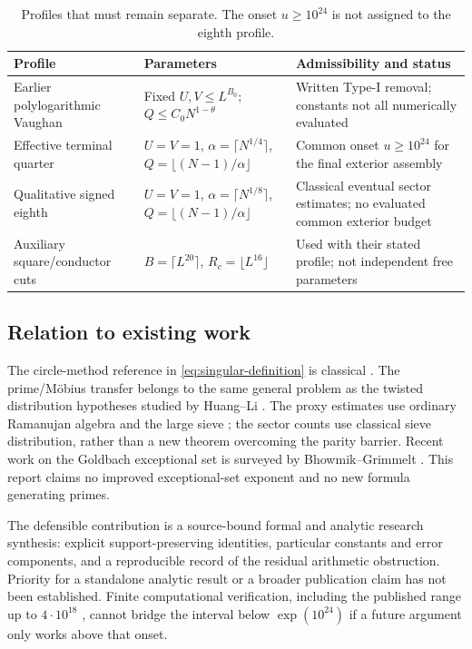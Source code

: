\documentclass[11pt,a4paper]{article}
\theoremstyle{definition}
\theoremstyle{remark}
\begin{document}
\begin{table}[htbp]\centering\small
\begin{tabularx}{\textwidth}{@{}P{.24\textwidth}XP{.24\textwidth}@{}}\toprule
Profile & Parameters & Admissibility and status\\\midrule
Earlier polylogarithmic Vaughan & Fixed $U,V\le L^{B_0}$; $Q\le C_0N^{1-\theta}$ & Written Type-I removal; constants not all numerically evaluated\\
Effective terminal quarter & $U=V=1$, $\alpha=\lceil N^{1/4}\rceil$, $Q=\lfloor(N-1)/\alpha\rfloor$ & Common onset $u\ge10^{24}$ for the final exterior assembly\\
Qualitative signed eighth & $U=V=1$, $\alpha=\lceil N^{1/8}\rceil$, $Q=\lfloor(N-1)/\alpha\rfloor$ & Classical eventual sector estimates; no evaluated common exterior budget\\
Auxiliary square/conductor cuts & $B=\lceil L^{20}\rceil$, $R_c=\lfloor L^{16}\rfloor$ & Used with their stated profile; not independent free parameters\\\bottomrule
\end{tabularx}
\caption{Profiles that must remain separate. The onset $u\ge10^{24}$ is not assigned to the eighth profile.}\label{tab:profiles}
\end{table}

\subsection{Relation to existing work}
The circle-method reference in \eqref{eq:singular-definition} is classical \cite{HL}. The prime/M\"obius transfer belongs to the same general problem as the twisted distribution hypotheses studied by Huang--Li \cite{HLi}. The proxy estimates use ordinary Ramanujan algebra and the large sieve \cite{MV,GY}; the sector counts use classical sieve distribution, rather than a new theorem overcoming the parity barrier. Recent work on the Goldbach exceptional set is surveyed by Bhowmik--Grimmelt \cite{BG}. This report claims no improved exceptional-set exponent and no new formula generating primes.

The defensible contribution is a source-bound formal and analytic research synthesis: explicit support-preserving identities, particular constants and error components, and a reproducible record of the residual arithmetic obstruction. Priority for a standalone analytic result or a broader publication claim has not been established. Finite computational verification, including the published range up to $4\cdot10^{18}$ \cite{OeS}, cannot bridge the interval below $\exp(10^{24})$ if a future argument only works above that onset.
\end{document}
